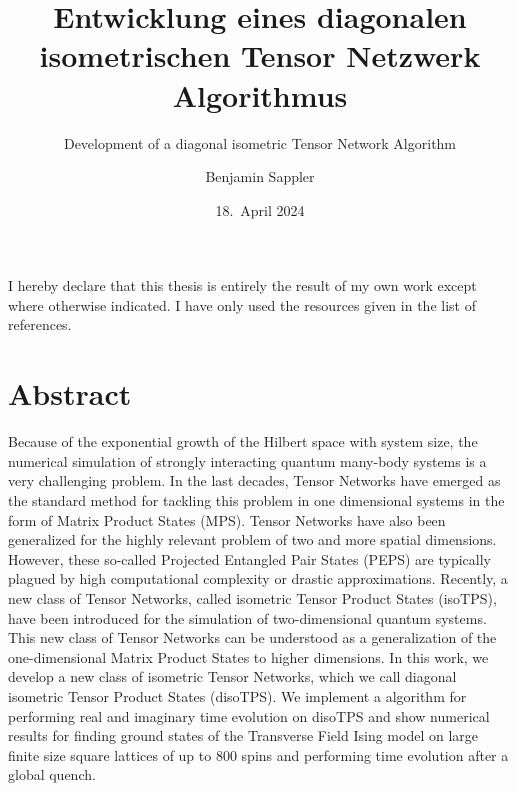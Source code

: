 \documentclass[encoding=utf8,british]{template/thesis}
\title{Entwicklung eines diagonalen isometrischen Tensor Netzwerk Algorithmus}
\subtitle{Development of a diagonal isometric Tensor Network Algorithm}
\author{Benjamin Sappler}
\date{18.~April 2024}
\begin{document}
	\frontmatter
	\maketitle
	
	\newpage
	\thispagestyle{empty}
	
	\null\vfill
	\raggedright\noindent
	I hereby declare that this thesis is entirely the result of my own work except where otherwise indicated. I have only used the resources given in the list of references. \par
	\vspace{2cm}
	\noindent
	\par
	
	\newpage
	\thispagestyle{empty}
	
	\justifying
	
	\section*{Abstract}
	Because of the exponential growth of the Hilbert space with system size, the numerical simulation of strongly interacting quantum many-body systems is a very challenging problem. In the last decades, Tensor Networks have emerged as the standard method for tackling this problem in one dimensional systems in the form of Matrix Product States (MPS). Tensor Networks have also been generalized for the highly relevant problem of two and more spatial dimensions. However, these so-called Projected Entangled Pair States (PEPS) are typically plagued by high computational complexity or drastic approximations. Recently, a new class of Tensor Networks, called isometric Tensor Product States (isoTPS), have been introduced for the simulation of two-dimensional quantum systems. This new class of Tensor Networks can be understood as a generalization of the one-dimensional Matrix Product States to higher dimensions. In this work, we develop a new class of isometric Tensor Networks, which we call diagonal isometric Tensor Product States (disoTPS). We implement a algorithm for performing real and imaginary time evolution on disoTPS and show numerical results for finding ground states of the Transverse Field Ising model on large finite size square lattices of up to 800 spins and performing time evolution after a global quench.
	
	\tableofcontents
	\thispagestyle{empty}
	
	\mainmatter
	
\end{document}
